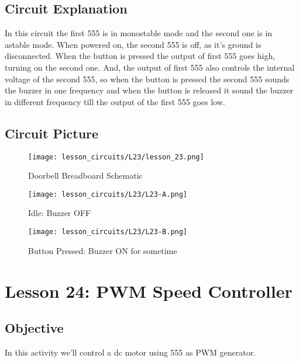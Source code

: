 \subsection{Circuit Explanation}
In this circuit the first 555 is in monostable mode and the second one is in astable mode. When powered on, the second 555 is 
off, as it's ground is disconnected. When the button is pressed the output of first 555 goes high, turning on the second one. 
And, the output of first 555 also controls the internal voltage of the second 555, so when the button is pressed the second 555 
sounds the buzzer in one frequency and when the button is released it sound the buzzer in different frequency till the output of 
the first 555 goes low.
\subsection{Circuit Picture}
\begin{figure}[!htp]
    \centering
    \texttt{[image: lesson\_circuits/L23/lesson\_23.png]}
    \caption{Doorbell Breadboard Schematic}
    \label{fig:555_doorbell_sch}
\end{figure}
\begin{figure}[!htp]
    \centering
    \texttt{[image: lesson\_circuits/L23/L23-A.png]}
    \caption{Idle: Buzzer OFF}
    \label{fig:555_doorbell_obb}
\end{figure}
\begin{figure}[!htp]
    \centering
    \texttt{[image: lesson\_circuits/L23/L23-B.png]}
    \caption{Button Pressed: Buzzer ON for sometime}
    \label{fig:555_doorbell_obb1}
\end{figure}
\clearpage
\section{Lesson 24: PWM Speed Controller}
\subsection{Objective}
In this activity we'll control a dc motor using 555 as PWM generator.
